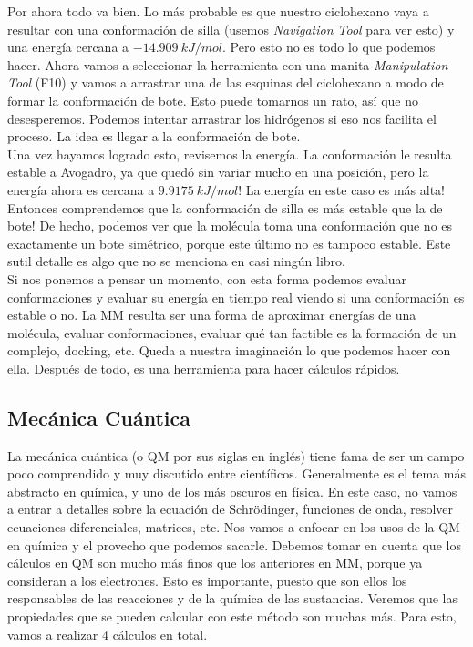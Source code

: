 \documentclass[10pt,letterpaper]{article}
\begin{document}
Por ahora todo va bien. Lo m\'as probable es que nuestro ciclohexano vaya a resultar con una conformaci\'on de silla (usemos \emph{Navigation Tool} para ver esto) y una energ\'ia cercana a $-14.909\ kJ/mol$. Pero esto no es todo lo que podemos hacer. Ahora vamos a seleccionar la herramienta con una manita \emph{Manipulation Tool} (F10) y vamos a arrastrar una de las esquinas del ciclohexano a modo de formar la conformaci\'on de bote. Esto puede tomarnos un rato, as\'i que no desesperemos. Podemos intentar arrastrar los hidr\'ogenos si eso nos facilita el proceso. La idea es llegar a la conformaci\'on de bote.\\

Una vez hayamos logrado esto, revisemos la energ\'ia. La conformaci\'on le resulta estable a Avogadro, ya que qued\'o sin variar mucho en una posici\'on, pero la energ\'ia ahora es cercana a $9.9175\ kJ/mol$! La energ\'ia en este caso es m\'as alta! Entonces comprendemos que la conformaci\'on de silla es m\'as estable que la de bote! De hecho, podemos ver que la mol\'ecula toma una conformaci\'on que no es exactamente un bote sim\'etrico, porque este \'ultimo no es tampoco estable. Este sutil detalle es algo que no se menciona en casi ning\'un libro.\\

Si nos ponemos a pensar un momento, con esta forma podemos evaluar conformaciones y evaluar su energ\'ia en tiempo real viendo si una conformaci\'on es estable o no. La MM resulta ser una forma de aproximar energ\'ias de una mol\'ecula, evaluar conformaciones, evaluar qu\'e tan factible es la formaci\'on de un complejo, docking, etc. Queda a nuestra imaginaci\'on lo que podemos hacer con ella. Despu\'es de todo, es una herramienta para hacer c\'alculos r\'apidos.

\subsection{Mec\'anica Cu\'antica}
La mec\'anica cu\'antica (o QM por sus siglas en ingl\'es) tiene fama de ser un campo poco comprendido y muy discutido entre cient\'ificos. Generalmente es el tema m\'as abstracto en qu\'imica, y uno de los m\'as oscuros en f\'isica. En este caso, no vamos a entrar a detalles sobre la ecuaci\'on de Schr\"odinger, funciones de onda, resolver ecuaciones diferenciales, matrices, etc. Nos vamos a enfocar en los usos de la QM en qu\'imica y el provecho que podemos sacarle. Debemos tomar en cuenta que los c\'alculos en QM son mucho m\'as finos que los anteriores en MM, porque ya consideran a los electrones. Esto es importante, puesto que son ellos los responsables de las reacciones y de la qu\'imica de las sustancias. Veremos que las propiedades que se pueden calcular con este m\'etodo son muchas m\'as. Para esto, vamos a realizar 4 c\'alculos en total.\\
\end{document}
